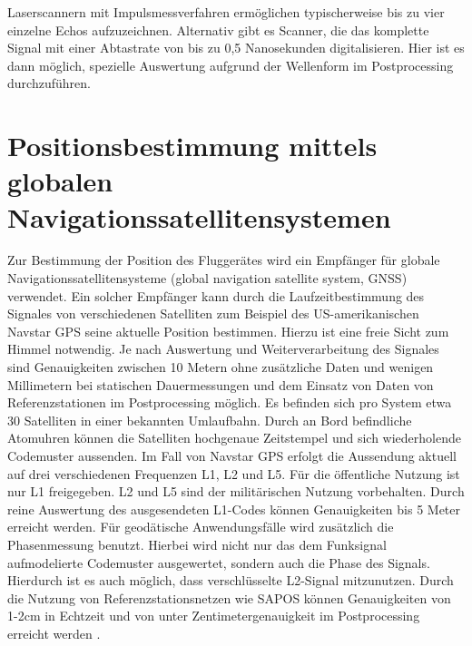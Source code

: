 \documentclass[a4paper,12pt,bibliography=totoc, listof=totoc,titlepage,pointlessnumbers]{scrreprt}
\begin{document}
Laser\-scan\-nern mit Impulsmessverfahren ermöglichen typischerweise bis zu vier einzelne Echos aufzuzeichnen. Alternativ gibt es Scanner, die das komplette Signal mit einer Abtastrate von bis zu 0,5 Nanosekunden digitalisieren. Hier ist es dann möglich, spezielle Auswertung aufgrund der Wellenform im Postprocessing durchzuführen. \citep[S. 29]{beraldin}

\section{Positionsbestimmung mittels globalen Navigationssatellitensystemen}
\label{s:GNSS}
Zur Bestimmung der Position des Fluggerätes wird ein Empfänger für globale Navigationssatellitensysteme (global navigation satellite system, GNSS) verwendet. Ein solcher Empfänger kann durch die Laufzeitbestimmung des Signales von verschiedenen Satelliten zum Beispiel des US-amerikanischen Navstar GPS seine aktuelle Position bestimmen. Hierzu ist eine freie Sicht zum Himmel notwendig. Je nach Auswertung und Weiterverarbeitung des Signales sind Genauigkeiten zwischen 10 Metern ohne zusätzliche Daten und wenigen Millimetern bei statischen Dauermessungen und dem Einsatz von Daten von Referenzstationen im Postprocessing möglich. Es befinden sich pro System etwa 30 Satelliten in einer bekannten Umlaufbahn. Durch an Bord befindliche Atomuhren können die Satelliten hochgenaue Zeitstempel und sich wiederholende Codemuster aussenden. Im Fall von Navstar GPS erfolgt die Aussendung aktuell auf drei verschiedenen Frequenzen L1, L2 und L5. Für die öffentliche Nutzung ist nur L1 freigegeben. L2 und L5 sind der militärischen Nutzung vorbehalten. Durch reine Auswertung des ausgesendeten L1-Codes können Genauigkeiten bis 5 Meter erreicht werden. Für geodätische Anwendungsfälle wird zusätzlich die Phasenmessung benutzt. Hierbei wird nicht nur das dem Funksignal aufmodelierte Codemuster ausgewertet, sondern auch die Phase des Signals. Hierdurch ist es auch möglich, dass verschlüsselte L2-Signal mitzunutzen. Durch die Nutzung von Referenzstationsnetzen wie SAPOS können Genauigkeiten von 1-2cm in Echtzeit und von unter Zentimetergenauigkeit im Postprocessing erreicht werden \citep[S. 375]{Witte2006}.
\end{document}
